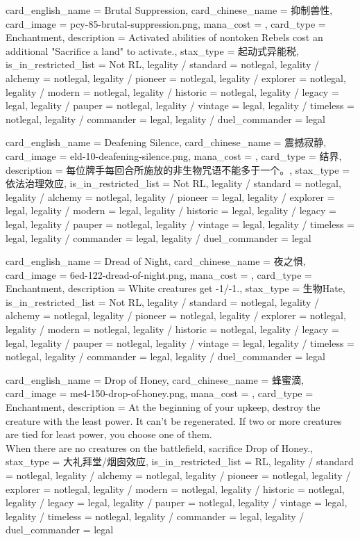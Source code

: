 \documentclass[lang = cn, color = black, 10pt]{AllThatStax}
\begin{document}
\card
{
	card_english_name = {Brutal Suppression},
	card_chinese_name = {抑制兽性},
	card_image = pcy-85-brutal-suppression.png,
	mana_cost = ,
	card_type = Enchantment,
	description = {Activated abilities of nontoken Rebels cost an additional "Sacrifice a land" to activate.},
	stax_type = 起动式异能税,
	is_in_restricted_list = Not RL,
	legality / standard = notlegal,
	legality / alchemy = notlegal,
	legality / pioneer = notlegal,
	legality / explorer = notlegal,
	legality / modern = notlegal,
	legality / historic = notlegal,
	legality / legacy = legal,
	legality / pauper = notlegal,
	legality / vintage = legal,
	legality / timeless = notlegal,
	legality / commander = legal,
	legality / duel_commander = legal
}

\card
{
	card_english_name = {Deafening Silence},
	card_chinese_name = {震撼寂静},
	card_image = eld-10-deafening-silence.png,
	mana_cost = ,
	card_type = 结界,
	description = {每位牌手每回合所施放的非生物咒语不能多于一个。},
	stax_type = 依法治理效应,
	is_in_restricted_list = Not RL,
	legality / standard = notlegal,
	legality / alchemy = notlegal,
	legality / pioneer = legal,
	legality / explorer = legal,
	legality / modern = legal,
	legality / historic = legal,
	legality / legacy = legal,
	legality / pauper = notlegal,
	legality / vintage = legal,
	legality / timeless = legal,
	legality / commander = legal,
	legality / duel_commander = legal
}

\card
{
	card_english_name = {Dread of Night},
	card_chinese_name = {夜之惧},
	card_image = 6ed-122-dread-of-night.png,
	mana_cost = ,
	card_type = Enchantment,
	description = {White creatures get -1/-1.},
	stax_type = 生物Hate,
	is_in_restricted_list = Not RL,
	legality / standard = notlegal,
	legality / alchemy = notlegal,
	legality / pioneer = notlegal,
	legality / explorer = notlegal,
	legality / modern = notlegal,
	legality / historic = notlegal,
	legality / legacy = legal,
	legality / pauper = notlegal,
	legality / vintage = legal,
	legality / timeless = notlegal,
	legality / commander = legal,
	legality / duel_commander = legal
}

\card
{
	card_english_name = {Drop of Honey},
	card_chinese_name = {蜂蜜滴},
	card_image = me4-150-drop-of-honey.png,
	mana_cost = ,
	card_type = Enchantment,
	description = {At the beginning of your upkeep, destroy the creature with the least power. It can't be regenerated. If two or more creatures are tied for least power, you choose one of them.\\
		When there are no creatures on the battlefield, sacrifice Drop of Honey.},
	stax_type = 大礼拜堂/烟囱效应,
	is_in_restricted_list = RL,
	legality / standard = notlegal,
	legality / alchemy = notlegal,
	legality / pioneer = notlegal,
	legality / explorer = notlegal,
	legality / modern = notlegal,
	legality / historic = notlegal,
	legality / legacy = legal,
	legality / pauper = notlegal,
	legality / vintage = legal,
	legality / timeless = notlegal,
	legality / commander = legal,
	legality / duel_commander = legal
}
\end{document}
